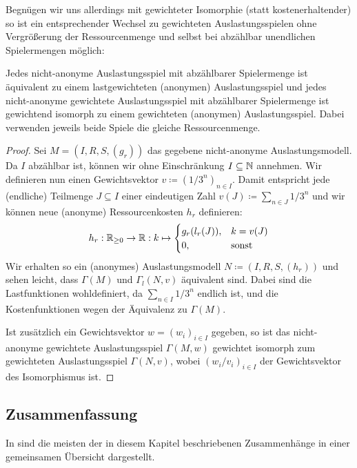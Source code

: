 Begnügen wir uns allerdings mit gewichteter Isomorphie (statt kostenerhaltender) so ist ein entsprechender Wechsel zu gewichteten Auslastungsspielen ohne Vergrößerung der Ressourcenmenge und selbst bei abzählbar unendlichen Spielermengen möglich:

\begin{satz}\label{satz:NichtAnonymeAusl}
	Jedes nicht-anonyme Auslastungsspiel mit abzählbarer Spielermenge ist äquivalent zu einem lastgewichteten (anonymen) Auslastungsspiel und jedes nicht-anonyme gewichtete Auslastungsspiel mit abzählbarer Spielermenge ist gewichtend isomorph zu einem gewichteten (anonymen) Auslastungsspiel. Dabei verwenden jeweils beide Spiele die gleiche Ressourcenmenge.
\end{satz}

\begin{proof}
	Sei $M = (I, R, S, (g_r))$ das gegebene nicht-anonyme Auslastungsmodell. Da $I$ abzählbar ist, können wir ohne Einschränkung $I \subseteq \mathbb{N}$ annehmen. Wir definieren nun einen Gewichtsvektor $v \coloneqq (1/3^n)_{n \in I}$. Damit entspricht jede (endliche) Teilmenge $J \subseteq I$ einer eindeutigen Zahl $v(J) \coloneqq \sum_{n \in J} 1/3^n$ und wir können neue (anonyme) Ressourcenkosten $h_r$ definieren:
	\[h_r: \mathbb{R}_{\geq 0} \to \mathbb{R}: k \mapsto \begin{cases}
	g_r(l_r(J)), 	&k = v(J) \\
	0,				&\text{sonst}
	\end{cases} \]
	Wir erhalten so ein (anonymes) Auslastungsmodell $N \coloneqq (I, R, S, (h_r))$ und sehen leicht, dass $\Gamma(M)$ und $\Gamma_l(N, v)$ äquivalent sind. Dabei sind die Lastfunktionen wohldefiniert, da $\sum_{n \in I} 1/3^n$ endlich ist, und die Kostenfunktionen wegen der Äquivalenz zu $\Gamma(M)$. 
	
	Ist zusätzlich ein Gewichtsvektor $w = (w_i)_{i\in I}$ gegeben, so ist das nicht-anonyme gewichtete Auslastungsspiel $\Gamma(M, w)$ gewichtet isomorph zum gewichteten Auslastungsspiel $\Gamma(N, v)$, wobei $(w_i/v_i)_{i \in I}$ der Gewichtsvektor des Isomorphismus ist.
\end{proof}


\subsection{Zusammenfassung}

In  sind die meisten der in diesem Kapitel beschriebenen Zusammenhänge in einer gemeinsamen Übersicht dargestellt.

